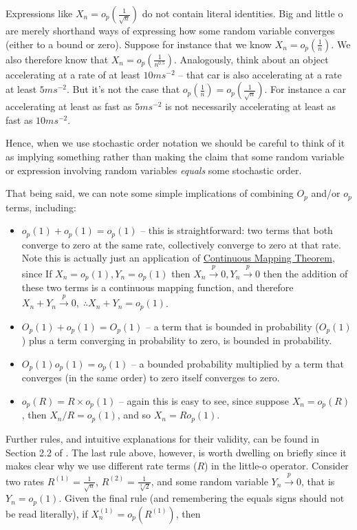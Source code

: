 \documentclass[
]{book}
\begin{document}
Expressions like \(X_n = o_p\left(\frac{1}{\sqrt{n}}\right)\) do not contain literal identities. Big and little o are merely shorthand ways of expressing how some random variable converges (either to a bound or zero). Suppose for instance that we know \(X_n = o_p(\frac{1}{n})\). We also therefore know that \(X_n = o_p(\frac{1}{n^{0.5}})\). Analogously, think about an object accelerating at a rate of at least \(10ms^{-2}\) -- that car is also accelerating at a rate at least \(5ms^{-2}\). But it's not the case that \(o_p(\frac{1}{n}) = o_p(\frac{1}{\sqrt{n}})\). For instance a car accelerating at least as fast as \(5ms^{-2}\) is not necessarily accelerating at least as fast as \(10ms^{-2}\).

Hence, when we use stochastic order notation we should be careful to think of it as implying something rather than making the claim that some random variable or expression involving random variables \emph{equals} some stochastic order.

That being said, we can note some simple implications of combining \(O_p\) and/or \(o_p\) terms, including:

\begin{itemize}
\item
  \(o_p(1) + o_p(1) = o_p(1)\) -- this is straightforward: two terms that both converge to zero at the same rate, collectively converge to zero at that rate. Note this is actually just an application of \protect\hyperlink{cmt}{Continuous Mapping Theorem}, since If \(X_n = o_p(1), Y_n = o_p(1)\) then \(X_n \xrightarrow{p} 0, Y_n \xrightarrow{p} 0\) then the addition of these two terms is a continuous mapping function, and therefore \(X_n + Y_n \xrightarrow{p} 0, \; \therefore X_n+Y_n = o_p(1)\).
\item
  \(O_p(1) + o_p(1) = O_p(1)\) -- a term that is bounded in probability (\(O_p(1)\)) plus a term converging in probability to zero, is bounded in probability.
\item
  \(O_p(1)o_p(1) = o_p(1)\) -- a bounded probability multiplied by a term that converges (in the same order) to zero itself converges to zero.
\item
  \(o_p(R) = R\times o_p(1)\) -- again this is easy to see, since suppose \(X_n = o_p(R)\), then \(X_n/R = o_p(1)\), and so \(X_n = Ro_p(1)\).
\end{itemize}

Further rules, and intuitive explanations for their validity, can be found in Section 2.2 of \citet{vaart_1998}. The last rule above, however, is worth dwelling on briefly since it makes clear why we use different rate terms (\(R\)) in the little-o operator. Consider two rates \(R^{(1)} = \frac{1}{\sqrt{n}}\), \(R^{(2)} = \frac{1}{\sqrt[3]{2}}\), and some random variable \(Y_n \xrightarrow{p}0\), that is \(Y_n = o_p(1)\). Given the final rule (and remembering the equals signs should not be read literally), if \(X_n^{(1)} = o_p(R^{(1)})\), then
\end{document}
